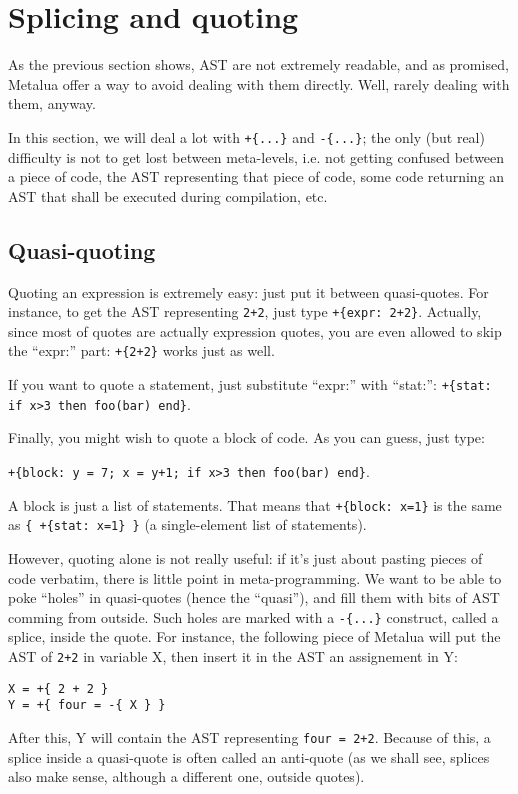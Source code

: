 \section{Splicing and quoting}
As the previous section shows, AST are not extremely readable, and as
promised, Metalua offer a way to avoid dealing with them
directly. Well, rarely dealing with them, anyway.

In this section, we will deal a lot with \verb|+{...}| and
\verb|-{...}|; the only (but real) difficulty is not to get lost
between meta-levels, i.e. not getting confused between a piece of
code, the AST representing that piece of code, some code returning an
AST that shall be executed during compilation, etc.

\subsection{Quasi-quoting}
Quoting an expression is extremely easy: just put it between
quasi-quotes. For instance, to get the AST representing \verb|2+2|,
just type \verb|+{expr: 2+2}|. Actually, since most of quotes are
actually expression quotes, you are even allowed to skip the ``expr:''
part: \verb|+{2+2}| works just as well.

If you want to quote a statement, just substitute ``expr:'' with
``stat:'': {\tt+\{stat: if x>3 then foo(bar) end\}}.

Finally, you might wish to quote a block of code. As you can guess,
just type:

\verb|+{block: y = 7; x = y+1; if x>3 then foo(bar) end}|.

A block is just a list of statements. That means that 
\verb|+{block: x=1}| is the same as \verb|{ +{stat: x=1} }| (a
single-element list of statements).

However, quoting alone is not really useful: if it's just about
pasting pieces of code verbatim, there is little point in
meta-programming. We want to be able to poke ``holes'' in quasi-quotes
(hence the ``quasi''), and fill them with bits of AST comming from
outside. Such holes are marked with a \verb|-{...}| construct, called
a splice, inside the quote. For instance, the following piece of
Metalua will put the AST of \verb|2+2| in variable X, then insert it
in the AST an assignement in Y:

\begin{verbatim}
X = +{ 2 + 2 }
Y = +{ four = -{ X } }
\end{verbatim}

After this, Y will contain the AST representing \verb|four = 2+2|.
Because of this, a splice inside a quasi-quote is often called an
anti-quote (as we shall see, splices also make sense, although a
different one, outside quotes).

